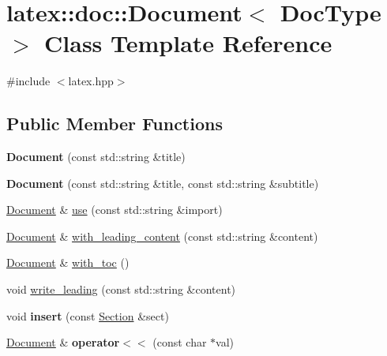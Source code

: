 \hypertarget{classlatex_1_1doc_1_1Document}{\section{latex\-:\-:doc\-:\-:Document$<$ Doc\-Type $>$ Class Template Reference}
\label{classlatex_1_1doc_1_1Document}
}


{\ttfamily \#include $<$latex.\-hpp$>$}

\subsection*{Public Member Functions}
\begin{DoxyCompactItemize}
\item 
\hypertarget{classlatex_1_1doc_1_1Document_ad03fa7f0d3271370006d20515a3fd5e0}{{\bfseries Document} (const std\-::string \&title)}\label{classlatex_1_1doc_1_1Document_ad03fa7f0d3271370006d20515a3fd5e0}

\item 
\hypertarget{classlatex_1_1doc_1_1Document_a95756c45b9f7b684d81920832971e6c1}{{\bfseries Document} (const std\-::string \&title, const std\-::string \&subtitle)}\label{classlatex_1_1doc_1_1Document_a95756c45b9f7b684d81920832971e6c1}

\item 
\hyperlink{classlatex_1_1doc_1_1Document}{Document} \& \hyperlink{classlatex_1_1doc_1_1Document_a0f449ee90309de24177f4bbc51bcc404}{use} (const std\-::string \&import)
\item 
\hyperlink{classlatex_1_1doc_1_1Document}{Document} \& \hyperlink{classlatex_1_1doc_1_1Document_a02070e69275d800b16c25f99725b5363}{with\-\_\-leading\-\_\-content} (const std\-::string \&content)
\item 
\hyperlink{classlatex_1_1doc_1_1Document}{Document} \& \hyperlink{classlatex_1_1doc_1_1Document_a42eea3ed819c215c5addf8b10fae4302}{with\-\_\-toc} ()
\item 
void \hyperlink{classlatex_1_1doc_1_1Document_a4225432b9f4e3837c4251c9b97c413c6}{write\-\_\-leading} (const std\-::string \&content)
\item 
\hypertarget{classlatex_1_1doc_1_1Document_a5a00cc1883a91126f7c9779d1c0990db}{void {\bfseries insert} (const \hyperlink{classlatex_1_1doc_1_1Section}{Section} \&sect)}\label{classlatex_1_1doc_1_1Document_a5a00cc1883a91126f7c9779d1c0990db}

\item 
\hypertarget{classlatex_1_1doc_1_1Document_a86621b9927d388202c62be1a72fcdb42}{\hyperlink{classlatex_1_1doc_1_1Document}{Document} \& {\bfseries operator$<$$<$} (const char $\ast$val)}\label{classlatex_1_1doc_1_1Document_a86621b9927d388202c62be1a72fcdb42}


\end{DoxyCompactItemize}
